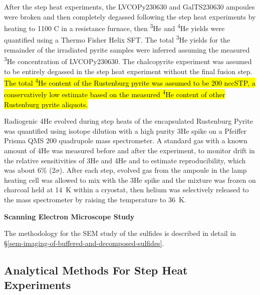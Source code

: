 After the step heat experiments, the LVCOPy230630 and GalTS230630 ampoules 
were broken and then completely degassed following the step heat experiments by heating to 1100 \textdegree C in a resistance furnace, then 
\textsuperscript{3}He and \textsuperscript{4}He yields were quantified using a Thermo Fisher Helix SFT. The total \textsuperscript{3}He yields 
for the remainder of the irradiated pyrite samples were inferred assuming the measured \textsuperscript{3}He concentration of LVCOPy230630. 
The chalcopyrite experiment was assumed to be entirely degassed in the step heat experiment without the final fusion step. 
\hl{The total \textsuperscript{4}He content of the Rustenburg pyrite was assumed to be 200 nccSTP, a conservatively low estimate based on the measured \textsuperscript{4}He content of other Rustenburg pyrite aliquots.}


Radiogenic 4He evolved during step heats of the encapsulated Rustenburg
Pyrite was quantified using isotope dilution with a high purity 3He
spike on a Pfeiffer Prisma QMS 200 quadrupole mass spectrometer. A
standard gas with a known amount of 4He was measured before and after
the experiment, to monitor drift in the relative sensitivities of 3He
and 4He and to estimate reproducibility, which was about 6\% (2$\sigma$). After
each step, evolved gas from the ampoule in the lamp heating cell was
allowed to mix with the 3He spike and the mixture was frozen on charcoal
held at 14~K within a cryostat, then helium was selectively released to
the mass spectrometer by raising the temperature to 36~K.

\textbf{Scanning Electron Microscope Study}

The methodology for the SEM study of the sulfides is described in detail in \S\ref{sem-imaging-of-buffered-and-decomposed-sulfides}.

\subsection{Analytical Methods For Step Heat Experiments}\label{sec:ch3-analytical-methods}


